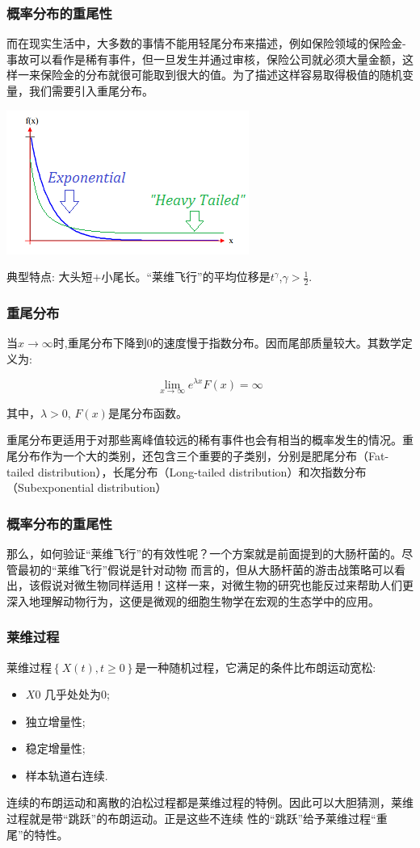 \begin{frame}

\frametitle{概率分布的重尾性}
\qquad 而在现实生活中，大多数的事情不能用轻尾分布来描述，例如保险领域的保险金-事故可以看作是稀有事件，但一旦发生并通过审核，保险公司就必须大量金额，这样一来保险金的分布就很可能取到很大的值。为了描述这样容易取得极值的随机变量，我们需要引入重尾分布。

\centering\includegraphics[scale=0.5]{images/heavy_tailed.png}

典型特点: 大头短$+$小尾长。“莱维飞行”的平均位移是$t^{\gamma}$,$\gamma>\frac{1}{2}$.
\end{frame}
\begin{frame}
\frametitle{重尾分布}
当$x\rightarrow \infty$时,重尾分布下降到$0$的速度慢于指数分布。因而尾部质量较大。其数学定义为:

\begin{displaymath}
\lim_{x\rightarrow \infty }e^{\lambda x}F\left ( x \right )=\infty
\end{displaymath}

其中，$\lambda>0$, $F(x)$是尾分布函数。

重尾分布更适用于对那些离峰值较远的稀有事件也会有相当的概率发生的情况。重尾分布作为一个大的类别，还包含三个重要的子类别，分别是肥尾分布（Fat-tailed distribution），长尾分布（Long-tailed distribution）和次指数分布（Subexponential distribution）
\end{frame}

\begin{frame}

\frametitle{概率分布的重尾性}
\qquad 那么，如何验证“莱维飞行”的有效性呢？一个方案就是前面提到的大肠杆菌的{\color{red}{趋化行为}}。尽管最初的“莱维飞行”假说是针对动物
而言的，但从大肠杆菌的游击战策略可以看出，该假说对微生物同样适用！这样一来，对微生物的研究也能反过来帮助人们更深入地理解动物行为，这便是微观的细胞生物学在宏观的生态学中的应用。

\end{frame}

\begin{frame}
\frametitle{莱维过程}
\qquad 莱维过程$\left \{ X\left ( t \right ),t\geq 0 \right \}$是一种随机过程，它满足的条件比布朗运动宽松:
\begin{itemize}
\item $X{0}$ 几乎处处为0;
\item 独立增量性;
\item 稳定增量性;
\item 样本轨道右连续.
\end{itemize}


\qquad 连续的布朗运动和离散的泊松过程都是莱维过程的特例。因此可以大胆猜测，莱维过程就是带“跳跃”的布朗运动。正是这些不连续
性的“跳跃”给予莱维过程“重尾”的特性。
\end{frame}